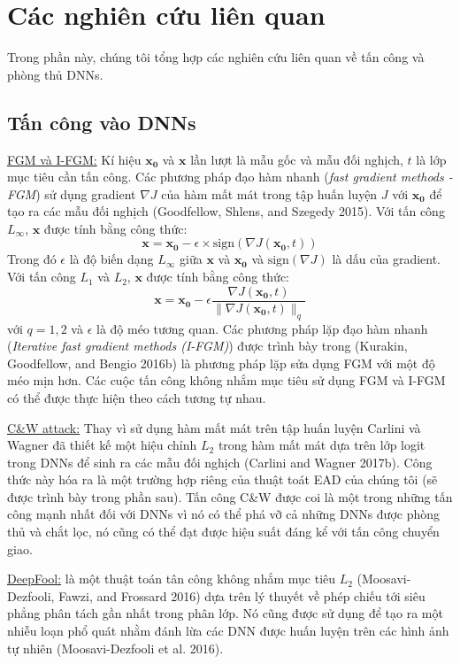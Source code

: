 \chapter{Các nghiên cứu liên quan}
Trong phần này, chúng tôi tổng hợp các nghiên cứu liên quan về tấn công và phòng thủ DNNs.

\section{Tấn công vào DNNs}
\underline{FGM và I-FGM:} Kí hiệu $\mathbf{x_0}$ và $\mathbf{x}$ lần lượt là mẫu gốc và mẫu đối nghịch,
$t$ là lớp mục tiêu cần tấn công. Các phương pháp đạo hàm nhanh (\textit{fast gradient 
methods - FGM}) sử dụng gradient $\nabla J$ của hàm mất mát trong tập huấn luyện $J$ với $\mathbf{x_0}$
để tạo ra các mẫu đối nghịch (Goodfellow, Shlens, and Szegedy 2015). Với tấn công $L_{\infty}$, 
$\mathbf{x}$ được tính bằng công thức:
\begin{equation}
    \mathbf{x} = \mathbf{x_0} - \epsilon \times \text{sign}(\nabla J(\mathbf{x_0}, t))
\end{equation}
Trong đó $\epsilon$ là độ biến dạng $L_{\infty}$ giữa $\mathbf{x}$ và $\mathbf{x_0}$ và 
$\text{sign}(\nabla J)$ là dấu của gradient. Với tấn công $L_1$ và $L_2$, $\mathbf{x}$ 
được tính bằng công thức:
\begin{equation}
    \mathbf{x} = \mathbf{x_0} - \epsilon \frac{\nabla J(\mathbf{x_0}, t)}
    {\lVert \nabla J(\mathbf{x_0}, t) \rVert _q}
\end{equation}
với $q = 1,2$ và $\epsilon$ là độ méo tương quan. Các phương pháp lặp đạo hàm nhanh 
(\textit{Iterative fast gradient methods (I-FGM)}) được trình bày trong (Kurakin, Goodfellow, 
and Bengio 2016b) là phương pháp lặp sửa dụng FGM với một độ méo mịn hơn. Các cuộc tấn công 
không nhắm mục tiêu sử dụng FGM và I-FGM có thể được thực hiện theo cách tương tự nhau. 

\underline{C\&W attack:} Thay vì sử dụng hàm mất mát trên tập huấn luyện Carlini và Wagner
đã thiết kế  một hiệu chỉnh $L_2$ trong hàm mất mát dựa trên lớp logit trong DNNs để sinh 
ra các mẫu đối nghịch (Carlini and Wagner 2017b). Công thức này hóa ra là một trường hợp riêng của 
thuật toát EAD của chúng tôi (sẽ được trình bày trong phần sau). Tấn công C\&W được coi 
là một trong những tấn công mạnh nhất đối với DNNs vì nó có thể phá vỡ cả những DNNs được 
phòng thủ và chắt lọc, nó cũng có thể đạt được hiệu suất đáng kể với tấn công chuyển giao. 

\underline{DeepFool:} là một thuật toán tân công không nhắm mục tiêu $L_2$ (Moosavi-Dezfooli, 
Fawzi, and Frossard 2016) dựa trên lý thuyết về phép chiếu tới siêu phẳng phân tách gần nhất
trong phân lớp. Nó cũng được sử dụng để tạo ra một nhiễu loạn phổ quát nhằm đánh lừa 
các DNN được huấn luyện trên các hình ảnh tự nhiên (Moosavi-Dezfooli et al. 2016).

